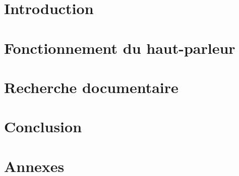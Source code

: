 \documentclass{report}
\begin{document}





\clearpage
\tableofcontents
\clearpage

\chapter{Introduction}



\chapter{Fonctionnement du haut-parleur}


\clearpage


\clearpage


\clearpage



\chapter{Recherche documentaire}





\chapter{Conclusion}



\chapter{Annexes}


\clearpage


\clearpage


\clearpage


\end{document}
